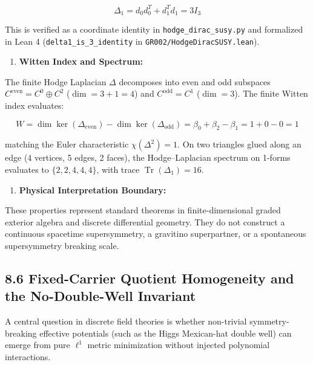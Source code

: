 \documentclass[11pt]{article}
\begin{document}
\begin{equation*}
   \Delta_1 = d_0 d_0^T + d_1^T d_1 = 3 I_3
\end{equation*}

This is verified as a coordinate identity in \texttt{hodge\_dirac\_susy.py} and formalized in Lean 4 (\texttt{delta1\_is\_3\_identity} in \texttt{GR002/HodgeDiracSUSY.lean}).

\begin{enumerate}[leftmargin=1.4em,itemsep=0.2em]
\item \textbf{Witten Index and Spectrum:}
\end{enumerate}
The finite Hodge Laplacian $\Delta$ decomposes into even and odd subspaces $C^{\mathrm{even}} = C^0 \oplus C^2$ ($\dim = 3 + 1 = 4$) and $C^{\mathrm{odd}} = C^1$ ($\dim = 3$). The finite Witten index evaluates:

\begin{equation*}
   W = \dim \ker(\Delta_{\mathrm{even}}) - \dim \ker(\Delta_{\mathrm{odd}}) = \beta_0 + \beta_2 - \beta_1 = 1 + 0 - 0 = 1
\end{equation*}

matching the Euler characteristic $\chi(\Delta^2) = 1$. On two triangles glued along an edge (4 vertices, 5 edges, 2 faces), the Hodge--Laplacian spectrum on 1-forms evaluates to $\{2, 2, 4, 4, 4\}$, with trace $\operatorname{Tr}(\Delta_1) = 16$.

\begin{enumerate}[leftmargin=1.4em,itemsep=0.2em]
\item \textbf{Physical Interpretation Boundary:}
\end{enumerate}
These properties represent standard theorems in finite-dimensional graded exterior algebra and discrete differential geometry. They do not construct a continuous spacetime supersymmetry, a gravitino superpartner, or a spontaneous supersymmetry breaking scale.

\subsection{\texorpdfstring{8.6 Fixed-Carrier Quotient Homogeneity and the No-Double-Well Invariant}{8.6 Fixed-Carrier Quotient Homogeneity and the No-Double-Well Invariant}}

A central question in discrete field theories is whether non-trivial symmetry-breaking effective potentials (such as the Higgs Mexican-hat double well) can emerge from pure $\ell^1$ metric minimization without injected polynomial interactions.
\end{document}
